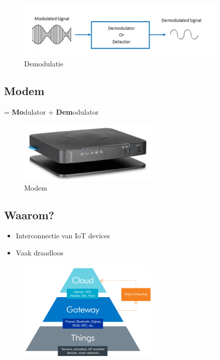 \documentclass{article}
\newcommand{\bold}[1]{\textbf{#1}}
\begin{document}
\begin{figure}[H]
    \centering
    \includegraphics[width=0.9\textwidth]{Screenshot_20200302_115359.png}
    \caption{Demodulatie}
\end{figure}

\subsection{Modem}
= \bold{Mo}dulator + \bold{Dem}odulator

\begin{figure}[H]
    \centering
    \includegraphics[width=0.6\textwidth]{Screenshot_20200302_115504.png}
    \caption{Modem}
\end{figure}

\subsection{Waarom?}

\begin{itemize}
    \item Interconnectie van IoT devices
    \item Vaak draadloos
\end{itemize}

\begin{figure}[H]
    \centering
    \includegraphics[width=0.6\textwidth]{Screenshot_20200302_115646.png}
    \caption{}
\end{figure}
\end{document}
